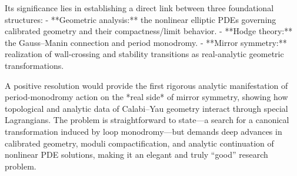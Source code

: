 Its significance lies in establishing a direct link between three foundational structures:
- **Geometric analysis:** the nonlinear elliptic PDEs governing calibrated geometry and their compactness/limit behavior.
- **Hodge theory:** the Gauss–Manin connection and period monodromy.
- **Mirror symmetry:** realization of wall-crossing and stability transitions as real-analytic geometric transformations.

A positive resolution would provide the first rigorous analytic manifestation of period-monodromy action on the *real side* of mirror symmetry, showing how topological and analytic data of Calabi–Yau geometry interact through special Lagrangians.  
The problem is straightforward to state—a search for a canonical transformation induced by loop monodromy—but demands deep advances in calibrated geometry, moduli compactification, and analytic continuation of nonlinear PDE solutions, making it an elegant and truly “good” research problem.